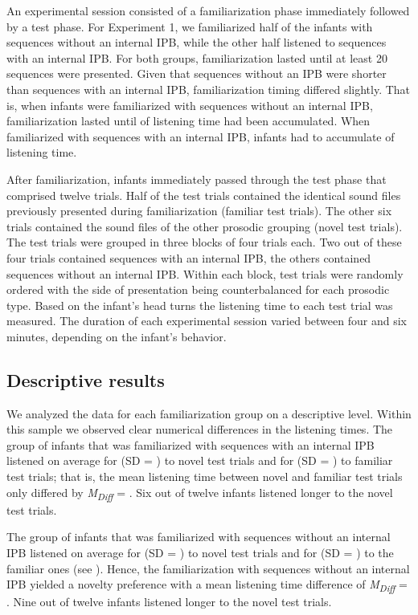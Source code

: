\documentclass[output=paper]{langscibook}
\begin{document}
An experimental session consisted of a familiarization phase immediately followed by a test phase. For Experiment 1, we familiarized half of the infants with sequences without an internal IPB, while the other half listened to sequences with an internal IPB. For both groups, familiarization lasted until at least 20 sequences were presented. Given that sequences without an IPB were shorter than sequences with an internal IPB, familiarization timing differed slightly. That is, when infants were familiarized with sequences without an internal IPB, familiarization lasted until  of listening time had been accumulated. When familiarized with sequences with an internal IPB, infants had to accumulate  of listening time.

After familiarization, infants immediately passed through the test phase that comprised twelve trials. Half of the test trials contained the identical sound files previously presented during familiarization (familiar test trials). The other six trials contained the sound files of the other prosodic grouping (novel test trials). The test trials were grouped in three blocks of four trials each. Two out of these four trials contained sequences with an internal IPB, the others contained sequences without an internal IPB. Within each block, test trials were randomly ordered with the side of presentation being counterbalanced for each prosodic type. Based on the infant’s head turns the listening time to each test trial was measured. The duration of each experimental session varied between four and six minutes, depending on the infant’s behavior.

\subsection{Descriptive results}\largerpage
We analyzed the data for each familiarization group on a descriptive level. Within this sample we observed clear numerical differences in the listening times. The group of infants that was familiarized with sequences with an internal IPB listened on average for   (SD = ) to novel test trials and for  (SD = ) to familiar test trials; that is, the mean listening time between novel and familiar test trials only differed by \textit{M\textsubscript{Diff}} = . Six out of twelve infants listened longer to the novel test trials.

The group of infants that was familiarized with sequences without an internal IPB listened on average for  (SD = ) to novel test trials and for  (SD = ) to the familiar ones (see ). Hence, the familiarization with sequences without an internal IPB yielded a novelty preference with a mean listening time difference of \textit{M\textsubscript{Diff}} = . Nine out of twelve infants listened longer to the novel test trials.
\end{document}
